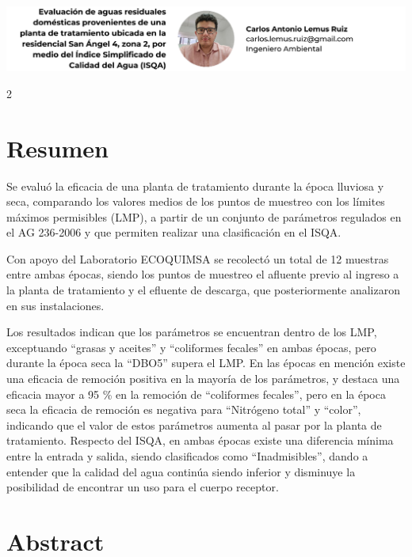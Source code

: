 \documentclass[12pt,spanish,Letterpaper,openany]{book}
\begin{document}
\begin{center}\includegraphics[width=1\linewidth]{autores/art06} \end{center}

\begin {multicols}{2}

\hypertarget{resumen-5}{%
\section{Resumen}\label{resumen-5}}

Se evaluó la eficacia de una planta de tratamiento durante la época lluviosa y seca, comparando los valores medios de los puntos de muestreo con los límites máximos permisibles (LMP), a partir de un conjunto de parámetros regulados en el AG 236-2006 y que permiten realizar una clasificación en el ISQA.

Con apoyo del Laboratorio ECOQUIMSA se recolectó un total de 12 muestras entre ambas épocas, siendo los puntos de muestreo el afluente previo al ingreso a la planta de tratamiento y el efluente de descarga, que posteriormente analizaron en sus instalaciones.

Los resultados indican que los parámetros se encuentran dentro de los LMP, exceptuando ``grasas y aceites'' y ``coliformes fecales'' en ambas épocas, pero durante la época seca la ``DBO5'' supera el LMP. En las épocas en mención existe una eficacia de remoción positiva en la mayoría de los parámetros, y destaca una eficacia mayor a 95 \% en la remoción de ``coliformes fecales'', pero en la época seca la eficacia de remoción es negativa para ``Nitrógeno total'' y ``color'', indicando que el valor de estos parámetros aumenta al pasar por la planta de tratamiento. Respecto del ISQA, en ambas épocas existe una diferencia mínima entre la entrada y salida, siendo clasificados como ``Inadmisibles'', dando a entender que la calidad del agua continúa siendo inferior y disminuye la posibilidad de encontrar un uso para el cuerpo receptor.

\hypertarget{abstract-5}{%
\section{Abstract}\label{abstract-5}}


\end{multicols}
\end{document}

